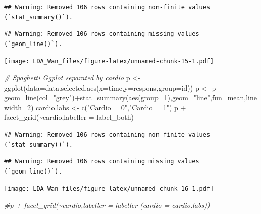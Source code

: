\documentclass[
]{article}
\newenvironment{Shaded}{\begin{snugshade}}{\end{snugshade}}
\newcommand{\AttributeTok}[1]{\textcolor[rgb]{0.77,0.63,0.00}{#1}}
\newcommand{\CommentTok}[1]{\textcolor[rgb]{0.56,0.35,0.01}{\textit{#1}}}
\newcommand{\DecValTok}[1]{\textcolor[rgb]{0.00,0.00,0.81}{#1}}
\newcommand{\FunctionTok}[1]{\textcolor[rgb]{0.00,0.00,0.00}{#1}}
\newcommand{\NormalTok}[1]{#1}
\newcommand{\OtherTok}[1]{\textcolor[rgb]{0.56,0.35,0.01}{#1}}
\newcommand{\SpecialCharTok}[1]{\textcolor[rgb]{0.00,0.00,0.00}{#1}}
\newcommand{\StringTok}[1]{\textcolor[rgb]{0.31,0.60,0.02}{#1}}
\begin{document}
\begin{verbatim}
## Warning: Removed 106 rows containing non-finite values (`stat_summary()`).
\end{verbatim}

\begin{verbatim}
## Warning: Removed 106 rows containing missing values (`geom_line()`).
\end{verbatim}

\texttt{[image: LDA\_Wan\_files/figure-latex/unnamed-chunk-15-1.pdf]}

\begin{Shaded}
\begin{Highlighting}[]
\CommentTok{\# Spaghetti Ggplot separated by cardio}
\NormalTok{p }\OtherTok{\textless{}{-}} \FunctionTok{ggplot}\NormalTok{(}\AttributeTok{data=}\NormalTok{data.selected,}\FunctionTok{aes}\NormalTok{(}\AttributeTok{x=}\NormalTok{time,}\AttributeTok{y=}\NormalTok{respons,}\AttributeTok{group=}\NormalTok{id))}
\NormalTok{p }\OtherTok{\textless{}{-}}\NormalTok{ p }\SpecialCharTok{+} \FunctionTok{geom\_line}\NormalTok{(}\AttributeTok{col=}\StringTok{"grey"}\NormalTok{)}\SpecialCharTok{+}\FunctionTok{stat\_summary}\NormalTok{(}\FunctionTok{aes}\NormalTok{(}\AttributeTok{group=}\DecValTok{1}\NormalTok{),}\AttributeTok{geom=}\StringTok{"line"}\NormalTok{,}\AttributeTok{fun=}\NormalTok{mean,}\AttributeTok{linewidth=}\DecValTok{2}\NormalTok{)}
\NormalTok{cardio.labs }\OtherTok{\textless{}{-}} \FunctionTok{c}\NormalTok{(}\StringTok{"Cardio = 0"}\NormalTok{,}\StringTok{"Cardio = 1"}\NormalTok{)}
\NormalTok{p }\SpecialCharTok{+} \FunctionTok{facet\_grid}\NormalTok{(}\SpecialCharTok{\textasciitilde{}}\NormalTok{cardio,}\AttributeTok{labeller =}\NormalTok{ label\_both) }
\end{Highlighting}
\end{Shaded}

\begin{verbatim}
## Warning: Removed 106 rows containing non-finite values (`stat_summary()`).
\end{verbatim}

\begin{verbatim}
## Warning: Removed 106 rows containing missing values (`geom_line()`).
\end{verbatim}

\texttt{[image: LDA\_Wan\_files/figure-latex/unnamed-chunk-16-1.pdf]}

\begin{Shaded}
\begin{Highlighting}[]
\CommentTok{\#p + facet\_grid(\textasciitilde{}cardio,labeller = labeller (cardio = cardio.labs)) }
\end{Highlighting}
\end{Shaded}
\end{document}
